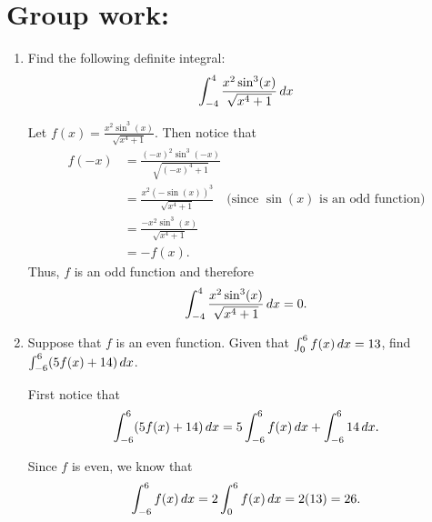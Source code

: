 \documentclass[nooutcomes]{ximera}
\begin{document}
		
		

	
	
	
	
	

\section*{Group work:}



\begin{problem}
	\begin{enumerate}
	
	\item  Find the following definite integral:
	\begin{equation*}
	\int_{-4}^4 \frac{x^2 \sin^3(x)}{\sqrt{x^4 + 1}} \,d x
	\end{equation*}
		\begin{freeResponse}
		Let $f(x) = \frac{x^2 \sin^3(x)}{\sqrt{x^4 + 1}}$.  
		Then notice that
			\begin{align*}
			f(-x) &= \frac{(-x)^2 \sin^3(-x)}{\sqrt{(-x)^4 + 1}}  \\
			&= \frac{x^2 (- \sin(x))^3}{\sqrt{x^4 + 1}}  \quad \text{(since } \sin(x) \text{ is an odd function)}  \\
			&= \frac{- x^2 \sin^3(x)}{\sqrt{x^4 + 1}}  \\
			&= -f(x).
			\end{align*}
		Thus, $f$ is an odd function and therefore
			\begin{equation*}
			\int_{-4}^4 \frac{x^2 \sin^3(x)}{\sqrt{x^4 + 1}} \,d x = 0.
			\end{equation*}
		\end{freeResponse}
		
		
		
	\item  Suppose that $f$ is an even function.  Given that $\int_0^6 f(x) \,d x = 13$, find $\int_{-6}^6 (5f(x) + 14) \,d x$.
		\begin{freeResponse}
		First notice that
			\begin{equation}\label{linear integral}
			\int_{-6}^6 (5f(x) + 14) \,d x = 5 \int_{-6}^6 f(x) \,d x + \int_{-6}^6 14 \,d x.
			\end{equation}
			
		Since $f$ is even, we know that
			\begin{equation}\label{int of f}
			\int_{-6}^6 f(x) \,d x = 2 \int_0^6 f(x) \,d x = 2 (13) = 26.
			\end{equation}
			

\end{freeResponse}
\end{enumerate}
\end{problem}
\end{document}
